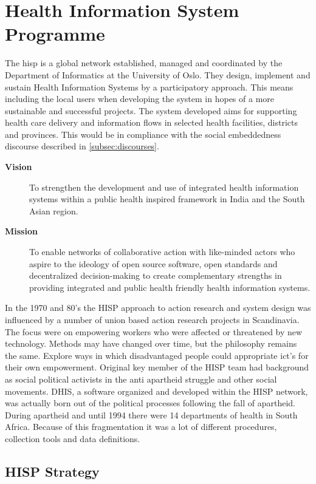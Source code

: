 \section{Health Information System Programme}
The \gls{hisp} is a global network established, managed and coordinated by the Department of Informatics at the University of Oslo. They design, implement and sustain Health Information Systems by a participatory approach. This means including the local users when developing the system in hopes of a more sustainable and successful projects. The system developed aims for supporting health care delivery and information flows in selected health facilities, districts and provinces. 
This would be in compliance with the social embeddedness discourse described in \ref{subsec:discourses}.

\begin{description}
\item[\textbf{Vision}]To strengthen the development and use of integrated health information systems within a public health inspired framework in India and
the South Asian region.
\item[\textbf{Mission}]To enable networks of collaborative action with like-minded actors
who aspire to the ideology of open source software, open standards
and decentralized decision-making to create complementary strengths
in providing integrated and public health friendly health information
systems.
\end{description}

In the 1970 and 80's the HISP approach to action research and system design was influenced by a number of union based action research projects in Scandinavia. 
The focus were on empowering workers who were affected or threatened by new technology. 
Methods may have changed over time, but the philosophy remains the same. 
Explore ways in which disadvantaged people could appropriate \gls{ict}'s for their own empowerment. Original key member of the HISP team had background as social political activists in the anti apartheid struggle and other social movements. DHIS, a software organized and developed within the HISP network, was actually born out of the political processes  following the fall of apartheid. During apartheid and until 1994 there were 14 departments of health in South Africa. Because of this fragmentation it was a lot of different procedures, collection tools and data definitions.

\cite{hisp:uio}
\cite{historyhisp:uio}
\cite{abouthisp:india}
\newpage
\subsection{HISP Strategy}


